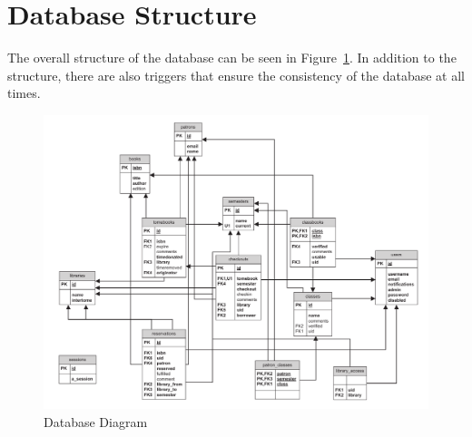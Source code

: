 \documentclass[12pt,titlepage]{article}
\begin{document}
\section{Database Structure}
\label{tomedbsection}
The overall structure of the database can be seen in Figure~\ref{tomedb}.  In addition to the structure, there are also triggers that ensure the consistency of the database at all times.
\begin{figure}[h]
	\includegraphics[width=\textwidth]{tomedb}
	\caption{Database Diagram}
	\label{tomedb}
\end{figure}
\end{document}
